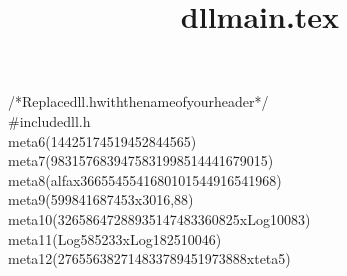 \documentclass[a4paper, 10pt]{article}
\title{dllmain.tex}
\newcommand\SPC{\hspace*{571em}}
\newcommand\QOT{\mbox{\char 34}}
\newcommand{\CppAComment}[1]{\textcolor[rgb]{0,0.5,0}{#1}}
\newcommand{\CppAIdentifier}[1]{#1}
\newcommand{\CppANumber}[1]{#1}
\newcommand{\CppAPreprocessor}[1]{\textcolor[rgb]{0,0,1}{#1}}
\newcommand{\CppASpace}[1]{\colorbox[rgb]{1,1,1}{#1}}
\newcommand{\CppASymbol}[1]{#1}
\begin{document}
\begin{ttfamily}
\noindent
\CppAComment{/*\SPC Replace\SPC \QOT dll.h\QOT \SPC with\SPC the\SPC name\SPC of\SPC your\SPC header\SPC */}\\
\CppAPreprocessor{\#include\SPC \QOT dll.h\QOT }\\
\CppASpace{\SPC \SPC \SPC }\CppAIdentifier{meta6}\CppASpace{\SPC }\CppASymbol{(}\CppANumber{14425174519452844565}\CppASymbol{)}\\
\CppASpace{\SPC \SPC \SPC \SPC \SPC \SPC \SPC \SPC \SPC \SPC }\CppAIdentifier{meta7}\CppASpace{\SPC }\CppASymbol{(}\CppANumber{9831576839475831998514441679015}\CppASymbol{)}\\
\CppASpace{\SPC \SPC \SPC \SPC \SPC \SPC \SPC \SPC \SPC \SPC \SPC \SPC \SPC \SPC \SPC \SPC \SPC \SPC \SPC }\CppAIdentifier{meta8}\CppASpace{\SPC }\CppASymbol{(}\CppAIdentifier{alfa}\CppASpace{\SPC }\CppAIdentifier{x}\CppASpace{\SPC }\CppANumber{3665545541680101544916541968}\CppASymbol{)}\\
\CppASpace{\SPC \SPC \SPC \SPC \SPC \SPC \SPC \SPC \SPC \SPC \SPC \SPC \SPC \SPC \SPC \SPC \SPC \SPC \SPC \SPC \SPC \SPC \SPC \SPC \SPC \SPC }\CppAIdentifier{meta}\CppASpace{\SPC }\CppANumber{9}\CppASpace{\SPC }\CppASymbol{(}\CppANumber{599841687453}\CppASpace{\SPC }\CppAIdentifier{x}\CppASpace{\SPC }\CppANumber{3016}\CppASymbol{,}\CppANumber{88}\CppASymbol{)}\\
\CppASpace{\SPC \SPC \SPC \SPC \SPC \SPC \SPC \SPC \SPC \SPC \SPC \SPC \SPC \SPC \SPC \SPC \SPC \SPC \SPC \SPC \SPC \SPC \SPC \SPC \SPC \SPC \SPC \SPC \SPC \SPC \SPC \SPC \SPC \SPC \SPC }\CppAIdentifier{meta}\CppASpace{\SPC }\CppANumber{10}\CppASpace{\SPC }\CppASymbol{(}\CppANumber{32658647288935147483360825}\CppASpace{\SPC }\CppAIdentifier{x}\CppASpace{\SPC }\CppAIdentifier{Log10083}\CppASymbol{)}\\
\CppASpace{\SPC \SPC \SPC \SPC \SPC \SPC \SPC \SPC \SPC \SPC \SPC \SPC \SPC \SPC \SPC \SPC \SPC \SPC \SPC \SPC \SPC \SPC \SPC \SPC \SPC \SPC \SPC \SPC \SPC \SPC \SPC \SPC \SPC \SPC \SPC \SPC \SPC \SPC \SPC \SPC \SPC \SPC \SPC \SPC \SPC }\CppAIdentifier{meta}\CppASpace{\SPC }\CppANumber{11}\CppASpace{\SPC }\CppASymbol{(}\CppAIdentifier{Log}\CppASpace{\SPC }\CppANumber{585233}\CppASpace{\SPC }\CppAIdentifier{x}\CppASpace{\SPC }\CppAIdentifier{Log}\CppASpace{\SPC }\CppANumber{182510046}\CppASymbol{)}\\
\CppASpace{\SPC \SPC \SPC \SPC \SPC \SPC \SPC \SPC \SPC \SPC \SPC \SPC \SPC \SPC \SPC \SPC \SPC \SPC \SPC \SPC \SPC \SPC \SPC \SPC \SPC \SPC \SPC \SPC \SPC \SPC \SPC \SPC \SPC \SPC \SPC \SPC \SPC \SPC \SPC \SPC \SPC \SPC \SPC \SPC \SPC \SPC \SPC \SPC \SPC \SPC \SPC \SPC \SPC \SPC }\CppAIdentifier{meta}\CppASpace{\SPC }\CppANumber{12}\CppASpace{\SPC }\CppASymbol{(}\CppANumber{276556382714833789451973888}\CppASpace{\SPC }\CppAIdentifier{x}\CppASpace{\SPC }\CppAIdentifier{teta5}\CppASymbol{)}\\

\end{ttfamily}
\end{document}
